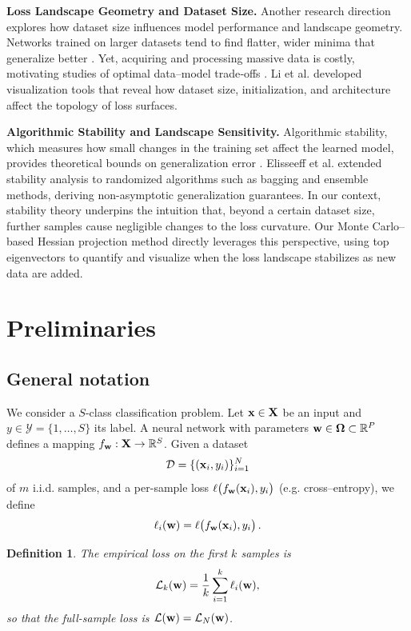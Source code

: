 \documentclass{article}
\newtheorem{definition}{Definition}
\begin{document}
\textbf{Loss Landscape Geometry and Dataset Size.}
Another research direction explores how dataset size influences model performance and landscape geometry. Networks trained on larger
datasets tend to find flatter, wider minima that generalize better \cite{wu2017towards}. Yet, acquiring and processing massive data is
costly, motivating studies of optimal data–model trade‑offs \cite{hoffmann2022training}. Li et al. \cite{li2018visualizing} developed
visualization tools that reveal how dataset size, initialization, and architecture affect the topology of loss surfaces.

\textbf{Algorithmic Stability and Landscape Sensitivity.}
Algorithmic stability, which measures how small changes in the training set affect the learned model, provides theoretical bounds on
generalization error \cite{bousquet2002stability}. Elisseeff et al. \cite{elisseeff2005stability} extended stability analysis to
randomized algorithms such as bagging and ensemble methods, deriving non-asymptotic generalization guarantees. In our context,
stability theory underpins the intuition that, beyond a certain dataset size, further samples cause negligible changes to the loss
curvature. Our Monte Carlo–based Hessian projection method directly leverages this perspective, using top eigenvectors to quantify
and visualize when the loss landscape stabilizes as new data are added.


\section{Preliminaries}\label{sec:prelim}

\subsection{General notation}

We consider a $S$-class classification problem. Let $\mathbf{x} \in \mathbf{X}$ be an input and $y \in \mathcal Y = \{1, \dots, S\}$ its label. A
neural network with parameters $\mathbf{w} \in \boldsymbol{\Omega} \subset \mathbb R^P$ defines a mapping $f_{\mathbf{w}} : \mathbf{X} \to \mathbb R^S$. Given a dataset
$$
  \mathcal D =
  \{(\mathbf{x}_i, y_i)\}_{i=1}^N
$$
of $m$ i.i.d. samples, and a per-sample loss $\ell \bigl( f_{\mathbf{w}}(\mathbf{x}_i), y_i \bigr)$ (e.g. cross–entropy), we define
$$
  \ell_i(\mathbf{w}) =
  \ell \bigl( f_{\mathbf{w}}(\mathbf{x}_i) , y_i \bigr)\,.
$$

\begin{definition}
  The empirical loss on the first $k$ samples is
  $$
    \mathcal{L}_k(\mathbf{w}) =
    \frac1k \sum_{i=1}^k \ell_i(\mathbf{w}),
  $$
  so that the full-sample loss is $\mathcal{L}(\mathbf{w}) = \mathcal{L}_N(\mathbf{w})$.
\end{definition}
\end{document}
